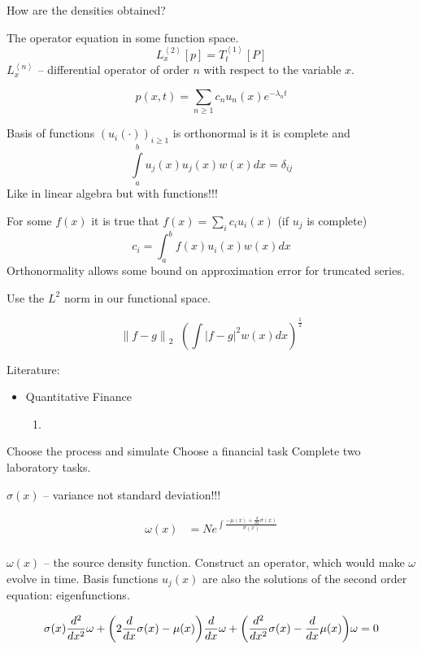 \documentclass[a4paper]{article}
\newcommand{\clo}[1]{{\left [ #1 \right ]}}
\newcommand{\brac}[1]{{\left ( #1 \right )}}
\newcommand{\abs}[1]{{\left | #1 \right |}}
\newcommand{\nrm}[1]{{\left\| #1 \right \|}}
\newcommand{\brkt}[1]{{\left\langle #1 \right\rangle}}
\newcommand{\defn}{\mathop{\overset{\Delta}{=}}\nolimits}
\begin{document}
How are the densities obtained?

The operator equation in some function space.
\[L_x^\brkt{2}\clo{p} = T_t^\brkt{1}\clo{P}\]
$L_x^\brkt{n}$ -- differential operator of order $n$ with respect to the variable $x$.

\[p(x,t) = \sum_{n\geq 1} c_n u_n(x) e^{-\lambda_n t}\]


Basis of functions $\brac{u_i(\cdot)}_{i\geq 1}$ is orthonormal is it is complete and
\[\int\limits_a^b u_j(x) u_j(x) w(x)dx = \delta_{ij}\]
Like in linear algebra but with functions!!!

For some $f(x)$  it is true that $f(x) = \sum_i c_i u_i(x)$ (if $u_j$ is complete) \[
c_i = \int_a^b f(x)u_i(x)w(x)dx
\]
Orthonormality allows some bound on approximation error for truncated series.

Use the $L^2$ norm in our functional space.

\[\nrm{f-g}_2 \defn \brac{\int \abs{f-g}^2 w(x) dx}^\frac{1}{2}\]



Literature:
\begin{itemize}
	\item Quantitative Finance
	\begin{enumerate}
		\item 
	\end{enumerate}
\end{itemize}

Choose the process and simulate
Choose a financial task
Complete two laboratory tasks.

$\sigma(x)$ -- variance not standard deviation!!!

\begin{align*}
	\omega(x) &= N e^{\int \frac{ - \mu(x) + \frac{d}{dx} \sigma(x)}{\sigma(x)}}\\
\end{align*}

$\omega(x)$ -- the source density function. Construct an operator, which would make $\omega$ evolve in time.
Basis functions $u_j(x)$ are also the solutions of the second order equation: eigenfunctions. 

\[
  \sigma(x) \frac{d^2}{dx^2} \omega \\
+ \brac{ 2\frac{d}{dx}\sigma(x) - \mu(x) } \frac{d}{dx} \omega \\
+ \brac{ \frac{d^2}{dx^2}\sigma(x) - \frac{d}{dx}\mu(x) } \omega \\
= 0
\]
\end{document}
